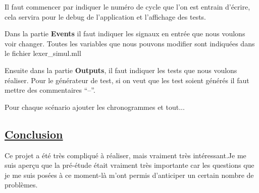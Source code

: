 \medskip

Il faut commencer par indiquer le numéro de cycle que l'on est entrain
d'écrire, cela servira pour le debug de l'application et l'affichage
des tests.

\medskip

Dans la partie \textbf{Events} il faut indiquer les signaux en entrée que nous
voulons voir changer. Toutes les variables que nous pouvons modifier
sont indiquées dans le fichier lexer\_simul.mll 

\medskip

Ensuite dans la partie \textbf{Outputs}, il faut indiquer les tests
que nous voulons réaliser.
Pour le générateur de test, si on veut que les test soient générés il
faut mettre des commentaires ``--''.

\bigskip

Pour chaque scénario ajouter les chronogrammes et tout...

\subsection{\underline{Conclusion}}
\label{sec:Conclusion}

Ce projet a été très compliqué à réaliser, mais vraiment très intéressant.Je me suis aperçu que la pré-étude était vraiment très importante car les questions que je me suis posées à ce moment-là m'ont permis d'anticiper un certain nombre de problèmes.


\newpage





